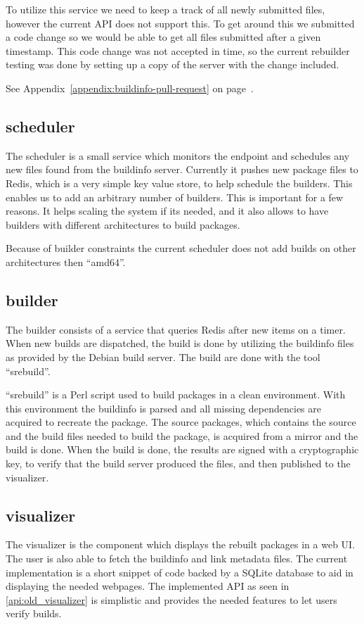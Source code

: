 \documentclass[../Main/thesis.tex]{subfiles}
\begin{document}
To utilize this service we need to keep a track of all newly submitted files,
however the current API does not support this. To get around this we submitted a
code change so we would be able to get all files submitted after a given
timestamp. This code change was not accepted in time, so the current rebuilder
testing was done by setting up a copy of the server with the change included.

See Appendix~\ref{appendix:buildinfo-pull-request} on
page~\pageref{appendix:buildinfo-pull-request}.

\subsection{scheduler}%
\label{sub:scheduler}
The scheduler is a small service which monitors the endpoint and schedules any
new files found from the buildinfo server. Currently it pushes new package files
to Redis, which is a very simple key value store, to help schedule the builders.
This enables us to add an arbitrary number of builders. This is important for a
few reasons. It helps scaling the system if its needed, and it also allows to
have builders with different architectures to build packages.

Because of builder constraints the current scheduler does not add builds on
other architectures then ``amd64''.

\subsection{builder}%
\label{sub:builder}
The builder consists of a service that queries Redis after new items on a timer.
When new builds are dispatched, the build is done by utilizing the buildinfo
files as provided by the Debian build server. The build are done with the tool
``srebuild''.

``srebuild'' is a Perl script used to build packages in a clean environment.
With this environment the buildinfo is parsed and all missing dependencies are
acquired to recreate the package. The source packages, which contains the source
and the build files needed to build the package, is acquired from a mirror and
the build is done. When the build is done, the results are signed with a
cryptographic key, to verify that the build server produced the files, and
then published to the visualizer.


\subsection{visualizer}%
\label{sub:visualizer}
The visualizer is the component which displays the rebuilt packages in a web UI.
The user is also able to fetch the buildinfo and link metadata files. The current
implementation is a short snippet of code backed by a SQLite database to aid in
displaying the needed webpages. The implemented API as seen in
\ref{api:old_visualizer} is simplistic and provides the needed features to let
users verify builds.
\end{document}
